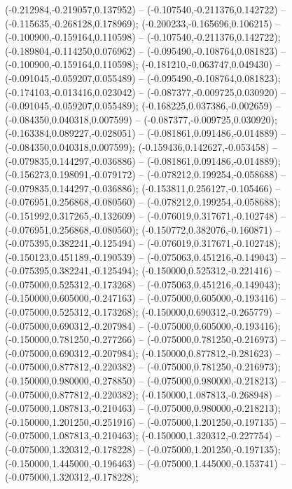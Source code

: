  (-0.212984,-0.219057,0.137952) -- (-0.107540,-0.211376,0.142722) -- (-0.115635,-0.268128,0.178969);
 (-0.200233,-0.165696,0.106215) -- (-0.100900,-0.159164,0.110598) -- (-0.107540,-0.211376,0.142722);
 (-0.189804,-0.114250,0.076962) -- (-0.095490,-0.108764,0.081823) -- (-0.100900,-0.159164,0.110598);
 (-0.181210,-0.063747,0.049430) -- (-0.091045,-0.059207,0.055489) -- (-0.095490,-0.108764,0.081823);
 (-0.174103,-0.013416,0.023042) -- (-0.087377,-0.009725,0.030920) -- (-0.091045,-0.059207,0.055489);
 (-0.168225,0.037386,-0.002659) -- (-0.084350,0.040318,0.007599) -- (-0.087377,-0.009725,0.030920);
 (-0.163384,0.089227,-0.028051) -- (-0.081861,0.091486,-0.014889) -- (-0.084350,0.040318,0.007599);
 (-0.159436,0.142627,-0.053458) -- (-0.079835,0.144297,-0.036886) -- (-0.081861,0.091486,-0.014889);
 (-0.156273,0.198091,-0.079172) -- (-0.078212,0.199254,-0.058688) -- (-0.079835,0.144297,-0.036886);
 (-0.153811,0.256127,-0.105466) -- (-0.076951,0.256868,-0.080560) -- (-0.078212,0.199254,-0.058688);
 (-0.151992,0.317265,-0.132609) -- (-0.076019,0.317671,-0.102748) -- (-0.076951,0.256868,-0.080560);
 (-0.150772,0.382076,-0.160871) -- (-0.075395,0.382241,-0.125494) -- (-0.076019,0.317671,-0.102748);
 (-0.150123,0.451189,-0.190539) -- (-0.075063,0.451216,-0.149043) -- (-0.075395,0.382241,-0.125494);
 (-0.150000,0.525312,-0.221416) -- (-0.075000,0.525312,-0.173268) -- (-0.075063,0.451216,-0.149043);
 (-0.150000,0.605000,-0.247163) -- (-0.075000,0.605000,-0.193416) -- (-0.075000,0.525312,-0.173268);
 (-0.150000,0.690312,-0.265779) -- (-0.075000,0.690312,-0.207984) -- (-0.075000,0.605000,-0.193416);
 (-0.150000,0.781250,-0.277266) -- (-0.075000,0.781250,-0.216973) -- (-0.075000,0.690312,-0.207984);
 (-0.150000,0.877812,-0.281623) -- (-0.075000,0.877812,-0.220382) -- (-0.075000,0.781250,-0.216973);
 (-0.150000,0.980000,-0.278850) -- (-0.075000,0.980000,-0.218213) -- (-0.075000,0.877812,-0.220382);
 (-0.150000,1.087813,-0.268948) -- (-0.075000,1.087813,-0.210463) -- (-0.075000,0.980000,-0.218213);
 (-0.150000,1.201250,-0.251916) -- (-0.075000,1.201250,-0.197135) -- (-0.075000,1.087813,-0.210463);
 (-0.150000,1.320312,-0.227754) -- (-0.075000,1.320312,-0.178228) -- (-0.075000,1.201250,-0.197135);
 (-0.150000,1.445000,-0.196463) -- (-0.075000,1.445000,-0.153741) -- (-0.075000,1.320312,-0.178228);
